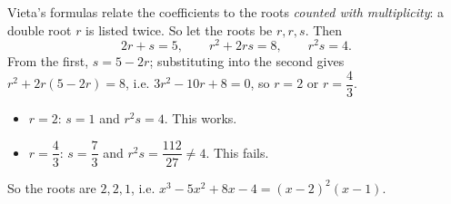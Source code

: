 Vieta's formulas relate the coefficients to the roots \emph{counted with multiplicity}: a double root $r$ is listed twice. So let the roots be $r,r,s$. Then
\[2r+s=5,\qquad r^2+2rs=8,\qquad r^2s=4.\]
From the first, $s=5-2r$; substituting into the second gives $r^2+2r(5-2r)=8$, i.e. $3r^2-10r+8=0$, so $r=2$ or $r=\dfrac43$.
\begin{itemize}
\item $r=2$: $s=1$ and $r^2s=4$. This works.
\item $r=\dfrac43$: $s=\dfrac73$ and $r^2s=\dfrac{112}{27}\ne4$. This fails.
\end{itemize}
So the roots are $\boxed{2,2,1}$, i.e. $x^3-5x^2+8x-4=(x-2)^2(x-1)$.
